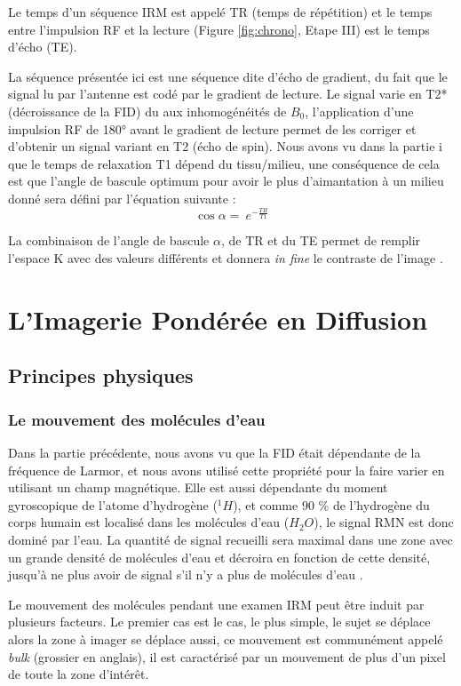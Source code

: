Le temps d’un séquence IRM est appelé TR (temps de répétition) et le temps entre l’impulsion RF et la lecture (Figure \ref{fig:chrono}, Etape III) est le temps d’écho (TE).

La séquence présentée ici est une séquence dite d’écho de gradient, du fait que le signal lu par l’antenne est codé par le gradient de lecture. Le signal varie en T2* (décroissance de la FID) du aux inhomogénéités de $B_0$, l’application d’une impulsion RF de 180° avant le gradient de lecture permet de les corriger et d’obtenir un signal variant en T2 (écho de spin).
Nous avons vu dans la partie i que le temps de relaxation T1 dépend du tissu/milieu, une conséquence de cela est que l’angle de bascule optimum pour avoir le plus d’aimantation à un milieu donné sera défini par l’équation suivante \cite{Ernst1966} :
\begin{equation}
\nonumber
\cos{\alpha}=\ e^{-\frac{TR}{T1}}
\end{equation}

La combinaison de l’angle de bascule $\alpha$, de TR et du TE permet de remplir l’espace K avec des valeurs différents et donnera \textit{in fine} le contraste de l’image \cite{Markl2012}.

\section{L’Imagerie Pondérée en Diffusion}
\subsection{Principes physiques}
\subsubsection{Le mouvement des molécules d’eau}
Dans la partie précédente, nous avons vu que la FID était dépendante de la fréquence de Larmor, et nous avons utilisé cette propriété pour la faire varier en utilisant un champ magnétique. Elle est aussi dépendante du moment gyroscopique de l’atome d’hydrogène ($^1H$), et comme 90 \% de l’hydrogène du corps humain est localisé dans les molécules d’eau ($H_2O$), le signal RMN est donc dominé par l’eau. La quantité de signal recueilli sera maximal dans une zone avec un grande densité de molécules d’eau et décroira en fonction de cette densité, jusqu’à ne plus avoir de signal s’il n’y a plus de molécules d’eau \cite{Mezer2016}.

Le mouvement des molécules pendant une examen IRM peut être induit par plusieurs facteurs. Le premier cas est le cas, le plus simple, le sujet se déplace alors la zone à imager se déplace aussi, ce mouvement est communément appelé \textit{bulk} (grossier en anglais), il est caractérisé par un mouvement de plus d’un pixel de toute la zone d’intérêt.

